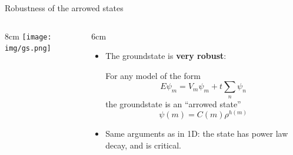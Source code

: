 \documentclass[xcolor=x11names,compress,professionalfonts, aspectratio=169]{beamer}
\renewcommand{\(}{\begin{columns}}
\renewcommand{\)}{\end{columns}}
\newcommand{\<}[1]{\begin{column}{#1}}
\renewcommand{\>}{\end{column}}
\begin{document}
\begin{frame}{Robustness of the arrowed states}

\begin{columns}
\<{8cm}
\texttt{[image: img/gs.png]}
\>
\<{6cm}
\begin{itemize}
\item The groundstate is \textbf{very robust}: 

For any model of the form
\[
	E \psi_m = V_m \psi_m + t\sum_{n} \psi_n
\]
the groundstate is an ``arrowed state''
\[
  \psi(m) = C(m) \rho^{h(m)}
\]
\item Same arguments as in 1D: the state has power law decay, and is critical.
\end{itemize}
\>
\end{columns}
\end{frame}
\end{document}
